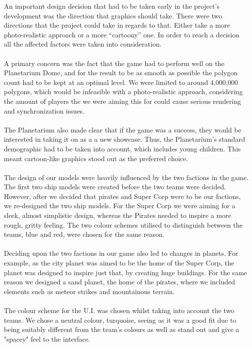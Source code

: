\documentclass[11pt,a4paper]{article}
\begin{document}
       \noindent
        An important design decision that had to be taken early in the project's development was the direction that graphics should take. There were two directions that the project could take in regards to that. Either take a more photo-realistic approach or a more “cartoony” one. In order to reach a decision all the affected factors were taken into consideration. \\ \\A primary concern was the fact that the game had to perform well on the Planetarium Dome, and for the result to be as smooth as possible the polygon count had to be kept at an optimal level. We were limited to around 4,000,000 polygons, which would be infeasible with a photo-realistic approach, considering the amount of players the we were aiming this for could cause serious rendering and synchronization issues. \\ \\
        \noindent
        The Planetarium also made clear that if the game was a success, they would be interested in taking it on as a a new showcase. Thus, the Planetarium’s standard demographic had to be taken into account, which includes young children. This meant cartoon-like graphics stood out as the preferred choice.  \\ \\
\noindent
        The design of our models were heavily influenced by the two factions in the game. The first two ship models were created before the two teams were decided. However, after we decided that pirates and Super Corp were to be our factions, we re-designed the two ship models. For the Super Corp we were aiming for a sleek, almost simplistic design, whereas the Pirates needed to inspire a more rough, gritty feeling. The two colour schemes utilised to distinguish between the teams, blue and red, were chosen for the same reason. \\ \\
\noindent
        Deciding upon the two factions in our game also led to changes in planets. For example, as the city planet was aimed to be the home of the Super Corp, the planet was designed to inspire just that, by creating huge buildings. For the same reason we designed a sand planet, the home of the pirates, where we included elements such as meteor strikes and mountainous terrain. \\ \\
\noindent
        The colour scheme for the U.I. was chosen whilst taking into account the two teams. We chose a neutral colour, turquoise, seeing as it was a good fit due to being suitably different from the team's colours as well as stand out and give a "spacey" feel to the interface. \\ \\
\end{document}
